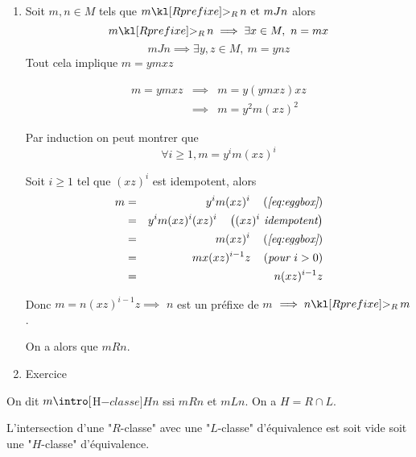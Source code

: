 \begin{proofI}
	\begin{enumerate}
		\item Soit $m,n \in M$ tels que $m \geqr n \et m J n$ alors
		      $$m \geqr n  \implies \exists x \in M, \ n = mx$$
		      $$m J n  \implies \exists y,z \in M, \ m = ynz$$
		      Tout cela implique $m = ymxz$

		      \begin{eqnarray*}
			      m = ymxz &\implies& m = y(ym xz)xz\\
			      &\implies& m = y^2m (xz)^2
		      \end{eqnarray*}


		      Par induction on peut montrer que
		      \begin{equation} \label{eq:eggbox}
			      \forall i \geq 1, m = y^i m (xz)^i
		      \end{equation}

		      Soit $i \geq 1$ tel que $(xz)^i$ est idempotent, alors
		      \begin{eqnarray*}
			      m &=& y^i m (xz)^i \quad\left(\textit{\ref{eq:eggbox}}\right)\\
			      &=& y^i m (xz)^i (xz)^i \quad\left(\textit{$(xz)^i$ idempotent}\right)\\
			      &=&  m (xz)^i \quad\left(\textit{\ref{eq:eggbox}}\right)\\
			      &=&  m x (xz)^{i-1} z \quad\left(\textit{pour $i > 0$}\right) \\
			      &=&  n (xz)^{i-1} z
		      \end{eqnarray*}

		      Donc $m = n (xz)^{i-1} z \implies$ $n$ est un préfixe de $m$ $\implies n \geqr m$.

		      On a alors que $m R n$.
		\item Exercice
	\end{enumerate}
\end{proofI}


\begin{definition}
	On dit $m \intro[$H$-classe]{H} n$ ssi $m R n $ et $m L n$. On a $H = R \cap L$.
\end{definition}

\begin{exercice}
	L'intersection d'une "$R$-classe" avec une "$L$-classe" d'équivalence est soit vide soit une "$H$-classe" d'équivalence.
\end{exercice}

